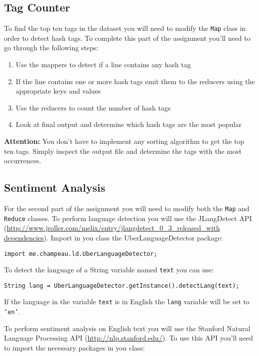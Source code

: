 \documentclass[a4paper,10pt]{article}
\begin{document}
\subsection{Tag Counter}
To find the top ten tags in the dataset you will need to modify the \texttt{Map} class in order to detect hash tags. To complete this part of the assignment you'll need to go through the following steps: 

\begin{enumerate}
 \item Use the mappers to detect if a line contains any hash tag
 \item If the line contains one or more hash tags emit them to the reducers using the appropriate keys and values 
 \item Use the reducers to count the number of hash tags 
 \item Look at final output and determine which hash tags are the most popular
\end{enumerate}

\textbf{Attention:} You don't have to implement any sorting algorithm to get the top ten tags. Simply inspect the output file and determine the tags with the most occurrences. 

\subsection{Sentiment Analysis}
For the second part of the assignment you will need to modify both the \texttt{Map} and \texttt{Reduce} classes. To perform language detection you will use the JLangDetect API (\url{http://www.jroller.com/melix/entry/jlangdetect\_0\_3\_released\_with dependencies}). Import in you class the UberLanguageDetector package: 

\lstset{language=Java}      
\begin{lstlisting}
import me.champeau.ld.UberLanguageDetector;
\end{lstlisting}

To detect the language of a String variable named \texttt{text} you can use: 

\begin{lstlisting}
String lang = UberLanguageDetector.getInstance().detectLang(text);
\end{lstlisting}

If the language in the variable \texttt{text} is in English the \texttt{lang} variable will be set to \texttt{'en'}. 

To perform sentiment analysis on English text you will use the Stanford Natural Language Processing API (\url{http://nlp.stanford.edu/}). To use this API you'll need to import the necessary packages in you class: 
\end{document}
